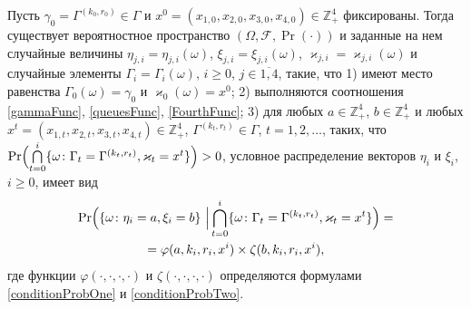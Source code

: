 \begin{theorem}
Пусть $\gamma_0=\Gamma^{(k_0,  r_0)}\in \Gamma$ и $x^0=(x_{1,  0},  x_{2,  0},   x_{3,  0},  x_{4,  0})\in \mathbb{Z}_+^4$ фиксированы.
Тогда существует вероятностное пространство $(\Omega,   {\mathcal F},   \Pr(\cdot))$ и заданные на нем случайные величины $\eta_{j,  i}=\eta_{j,  i}(\omega)$,   $\xi_{j,  i}=\xi_{j,  i}(\omega)$,   	 $\varkappa_{j,  i}=\varkappa_{j,  i}(\omega)$ и случайные элементы $\Gamma_i=\Gamma_i(\omega)$,   $i\geqslant 0$,   $j\in \overline{1,  4}$,   такие,   что 1) имеют место равенства $\Gamma_0(\omega) = \gamma_0$ и $\varkappa_0(\omega)=x^0$; 2) выполняются соотношения \eqref{gammaFunc},   \eqref{queuesFunc},   \eqref{FourthFunc}; 3) для любых  $a\in \mathbb{Z}_+^4$,   $b\in \mathbb{Z}_+^4$ и любых $x^t=(x_{1,  t},  x_{2,  t},  x_{3,  t},  x_{4,  t}) \in \mathbb{Z}_+^4$,   $\Gamma^{(k_t,  r_t)} \in \Gamma$,   $t = 1,   2,   \ldots$,   таких,   что $\Pr\Bigl(\bigcap\limits_{t=0}^{i}\{\omega\colon \Gamma_t=\Gamma^{(k_t,  r_t)},   \varkappa_t=x^t\}\Bigr)>0$,   условное распределение векторов $\eta_i$ и $\xi_i$,   $i \geqslant 0$,    имеет вид
\begin{multline}
\Pr \Bigl(\{ \omega \colon \eta_i = a,   \xi_i=b\} \,\,\Big
|\bigcap_{t=0}^{i}\{\omega\colon \Gamma_t=\Gamma^{(k_t,  r_t)},   \varkappa_t=x^t\}\Bigr)= \\=
\varphi(a,  k_i,  r_i,  x^i)\times \zeta(b,  k_i,  r_i,  x^i),  
\label{ProbablititiesToProve}
\end{multline}
где функции $\varphi(\cdot,   \cdot,   \cdot,   \cdot)$ и $\zeta(\cdot,   \cdot,   \cdot,   \cdot)$ определяются формулами \eqref{conditionProbOne} и \eqref{conditionProbTwo}.

\label{myTheorem}
\end{theorem}
